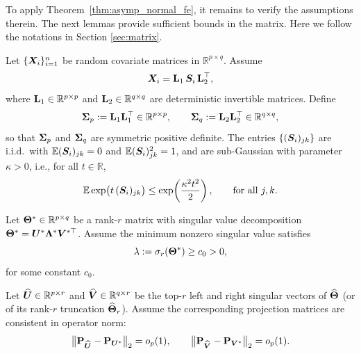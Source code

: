 \documentclass[authoryear,preprint,review,12pt]{elsarticle}
\begin{document}
	To apply Theorem~\ref{thm:asymp_normal_fe}, it remains to  verify the assumptions therein.
	The next lemmas provide sufficient bounds in the matrix. Here we follow the notations in Section \ref{sec:matrix}.
	
	\begin{assumption}\label{assum:xsubg_mat}
		Let $\{\boldsymbol X_i\}_{i=1}^n$ be random covariate matrices in $\mathbb{R}^{p\times q}$.
		Assume
		\[
		\boldsymbol X_i = \mathbf{L}_1\, \boldsymbol S_i\, \mathbf{L}_2^{\top},
		\]
		where $\mathbf{L}_1\in\mathbb{R}^{p\times p}$ and $\mathbf{L}_2\in\mathbb{R}^{q\times q}$ are deterministic
		invertible matrices. Define
		\[
		\mathbf{ \Sigma}_p := \mathbf{L}_1\mathbf{L}_1^{\top}\in\mathbb{R}^{p\times p},
		\qquad
		\mathbf{ \Sigma}_q := \mathbf{L}_2\mathbf{L}_2^{\top}\in\mathbb{R}^{q\times q},
		\]
		so that $\mathbf{ \Sigma}_p$ and $\mathbf{ \Sigma}_q$ are symmetric positive definite.
		The entries $\{(\boldsymbol S_i)_{jk}\}$ are i.i.d.\ with $\mathbb{E}(\boldsymbol S_i)_{jk}=0$ and
		$\mathbb{E}(\boldsymbol S_i)_{jk}^2=1$, and are sub-Gaussian with parameter $\kappa>0$, i.e., for all
		$t\in\mathbb{R}$,
		\[
		\mathbb{E}\exp\!\big(t\,(\boldsymbol S_i)_{jk}\big)\le \exp\!\left(\frac{\kappa^2 t^2}{2}\right),
		\qquad \text{for all } j,k.
		\]
	\end{assumption} 
	
	\begin{assumption}\label{ass:matrix_signal}
		Let $\mathbf{\Theta}^* \in \mathbb{R}^{p \times q}$ be a rank-$r$ matrix with singular value decomposition
		$\mathbf{\Theta}^* = \boldsymbol U^\ast \boldsymbol \Lambda^\ast \boldsymbol V^{\ast\top}$.
		Assume the minimum nonzero singular value satisfies
		\[
		\lambda := \sigma_r(\mathbf{\Theta}^\ast) \ge c_0 > 0,
		\]
		for some constant $c_0$. 
	\end{assumption}
	
	\begin{assumption}\label{ass:matrix_subspace}
		Let  $\widehat {\boldsymbol U}\in\mathbb R^{p\times r}$ and $\widehat {\boldsymbol V}\in\mathbb R^{q\times r}$ be the top-$r$ left and right singular
		vectors of $\widehat{\mathbf{\Theta}}$ (or of its rank-$r$ truncation $\widehat{\mathbf{\Theta}}_r$). Assume the corresponding projection matrices are consistent in operator norm:
		\[
		\bigl\|\mathbf{P}_{\widehat {\boldsymbol U}}-\mathbf{P}_{\boldsymbol U^\ast}\bigr\|_2=o_p(1),
		\qquad
		\bigl\|\mathbf{P}_{\widehat {\boldsymbol V}}-\mathbf{P}_{\boldsymbol V^\ast}\bigr\|_2=o_p(1).
		\]  
	\end{assumption} 
	
\end{document}
